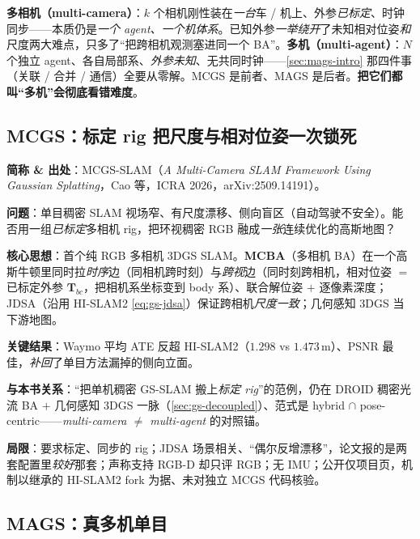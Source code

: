 \begin{insight}
\textbf{多相机（multi-camera）}：$k$ 个相机刚性装在\emph{一台}车 / 机上、外参\emph{已标定}、时钟同步——本质仍是\emph{一个 agent、一个机体系}。已知外参\emph{一举绕开}了未知相对位姿\emph{和}尺度两大难点，只多了“把跨相机观测塞进同一个 BA”。\textbf{多机（multi-agent）}：$N$ 个独立 agent、各自局部系、\emph{外参未知}、无共同时钟——\cref{sec:mags-intro} 那四件事（关联 / 合并 / 通信）全要从零解。MCGS 是前者、MAGS 是后者。\textbf{把它们都叫“多机”会彻底看错难度}。
\end{insight}

\subsection{MCGS：标定 rig 把尺度与相对位姿一次锁死}

\begin{paper}
\textbf{简称 \& 出处}：MCGS-SLAM（\emph{A Multi-Camera SLAM Framework Using Gaussian Splatting}，Cao 等，ICRA 2026，arXiv:2509.14191）\cite{cao2026mcgsslam}。

\textbf{问题}：单目稠密 SLAM 视场窄、有尺度漂移、侧向盲区（自动驾驶不安全）。能否用一组\emph{已标定}多相机 rig，把环视稠密 RGB 融成\emph{一张}连续优化的高斯地图？

\textbf{核心思想}：首个纯 RGB 多相机 3DGS SLAM。\textbf{MCBA}（多相机 BA）在一个高斯牛顿里同时拉\emph{时序}边（同相机跨时刻）与\emph{跨视}边（同时刻跨相机，相对位姿 $=$ 已标定外参 $\mathbf T_{bc}$，把相机系坐标变到 body 系）、联合解位姿 $+$ 逐像素深度；JDSA（沿用 HI-SLAM2 \cref{eq:gs-jdsa}）保证跨相机\emph{尺度一致}；几何感知 3DGS 当下游地图。

\textbf{关键结果}：Waymo 平均 ATE 反超 HI-SLAM2（$1.298$ vs $1.473$\,m）、PSNR 最佳，\emph{补回}了单目方法漏掉的侧向立面。

\textbf{与本书关系}：“把单机稠密 GS-SLAM 搬上\emph{标定 rig}”的范例，仍在 DROID 稠密光流 BA $+$ 几何感知 3DGS 一脉（\cref{sec:gs-decoupled}）、范式是 hybrid $\cap$ pose-centric——\emph{multi-camera $\ne$ multi-agent} 的对照锚。

\textbf{局限}：要求标定、同步的 rig；JDSA 场景相关、“偶尔反增漂移”，论文报的是两套配置里\emph{较好}那套；声称支持 RGB-D 却只评 RGB；无 IMU；公开仅项目页，机制以继承的 HI-SLAM2 fork 为据、未对独立 MCGS 代码核验。
\end{paper}

\subsection{MAGS：真多机单目}

